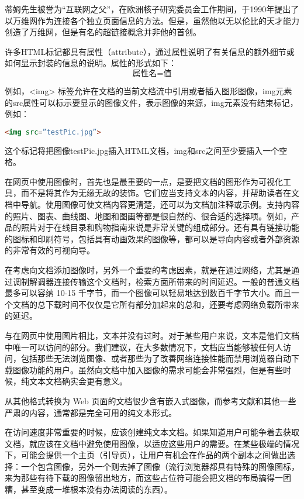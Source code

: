 蒂姆先生被誉为“互联网之父”，在欧洲核子研究委员会工作期间，于1990年提出了以万维网作为连接各个独立页面信息的方法。但是，虽然他以无以伦比的天才能力创造了万维网，但是有名的超链接概念并非他的首创。

许多HTML标记都具有属性（attribute），通过属性说明了有关信息的额外细节或如何显示封装的信息的说明。属性的形式如下：
$$\text{属性名} = \text{值}$$

例如，<img> 标签允许在文档的当前文档流中引用或者插入图形图像，img元素的src属性可以标示要显示的图像文件，表示图像的来源，img元素没有结束标记，例如：

\begin{lstlisting}[language=HTML]
<img src=”testPic.jpg”>
\end{lstlisting}

这个标记将把图像testPic.jpg插入HTML文档，img和src之间至少要插入一个空格。

在网页中使用图像时，首先也是最重要的一点，是要把文档的图形作为可视化工具，而不是将其作为无缘无故的装饰。它们应当支持文本的内容，并帮助读者在文档中导航。使用图像可使文档内容更清楚，还可以为文档加注释或示例。支持内容的照片、图表、曲线图、地图和图画等都是很自然的、很合适的选择项。例如，产品的照片对于在线目录和购物指南来说是非常关键的组成部分。还有具有链接功能的图标和印刷符号，包括具有动画效果的图像等，都可以是导向内容或者外部资源的非常有效的可视向导。

在考虑向文档添加图像时，另外一个重要的考虑因素，就是在通过网络，尤其是通过调制解调器连接传输这个文档时，检索方面所带来的时间延迟。一般的普通文档最多可以容纳 10-15 千字节，而一个图像可以轻易地达到数百千字节大小。而且一个文档的总下载时间不仅仅是它所有部分加起来的总和，还要考虑网络负载所带来的延迟。

与在网页中使用图片相比，文本并没有过时。对于某些用户来说，文本是他们文档中唯一可以访问的部分。我们建议，在大多数情况下，文档应当能够被任何人访问，包括那些无法浏览图像、或者那些为了改善网络连接性能而禁用浏览器自动下载图像功能的用户。虽然向文档中加入图像的需求可能会非常强烈，但是有些时候，纯文本文档确实会更有意义。

从其他格式转换为 Web 页面的文档很少含有嵌入式图像，而参考文献和其他一些严肃的内容，通常都是完全可用的纯文本形式。

在访问速度非常重要的时候，应该创建纯文本文档。如果知道用户可能争着去获取文档，就应该在文档中避免使用图像，以适应这些用户的需要。在某些极端的情况下，可能会提供一个主页（引导页），让用户有机会在作品的两个副本之间做出选择：一个包含图像，另外一个则去掉了图像（流行浏览器都具有特殊的图像图标，来为那些有待下载的图像留出地方，而这些占位符可能会把文档的布局搞得一团糟，甚至变成一堆根本没有办法阅读的东西）。

